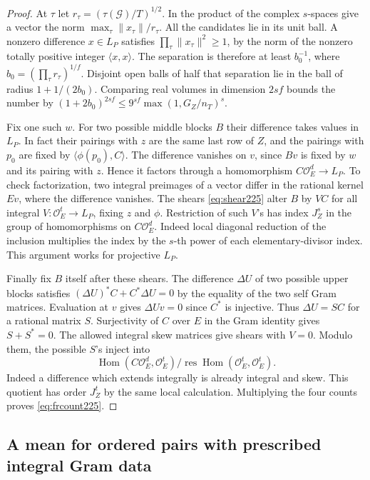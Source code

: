 \documentclass[a4paper,11pt]{article}
\theoremstyle{definition}
\theoremstyle{remark}
\numberwithin{equation}{section}
\newcommand{\OO}{\mathcal O}
\begin{document}
\begin{proof}
At \(\tau\) let \(r_\tau=(\tau(\mathcal G)/T)^{1/2}\).
In the product of the complex \(s\)-spaces give a vector
the norm \(\max_\tau\|x_\tau\|/r_\tau\). All the candidates
lie in its unit ball. A nonzero difference \(x\in L_P\)
satisfies \(\prod_\tau\|x_\tau\|^2\ge1\), by the norm of the
nonzero totally positive integer \(\langle x,x\rangle\).
The separation is therefore at least
\(b_0^{-1}\), where \(b_0=(\prod_\tau r_\tau)^{1/f}\).
Disjoint open balls of half that separation lie in the
ball of radius \(1+1/(2b_0)\). Comparing real volumes in
dimension \(2sf\) bounds the number by
\((1+2b_0)^{2sf}\le9^{sf}\max(1,G_Z/n_T)^s\).

Fix one such \(w\). For two possible middle blocks \(B\)
their difference takes values in \(L_P\). In fact their
pairings with \(z\) are the same last row of \(Z\), and
the pairings with \(p_0\) are fixed by
\(\langle\phi(p_0),C\rangle\). The difference vanishes on
\(v\), since \(Bv\) is fixed by \(w\) and its pairing with
\(z\). Hence it factors through a homomorphism
\(C\OO_E^d\to L_P\). To check factorization, two integral
preimages of a vector differ in the rational kernel \(Ev\),
where the difference vanishes. The shears \eqref{eq:shear225}
alter \(B\) by \(VC\) for all integral \(V:\OO_E^t\to L_P\),
fixing \(z\) and \(\phi\). Restriction of such \(V\)'s has
index \(J_Z^s\) in the group of homomorphisms on \(C\OO_E^d\).
Indeed local diagonal reduction of the inclusion multiplies
the index by the \(s\)-th power of each elementary-divisor
index. This argument works for projective \(L_P\).

Finally fix \(B\) itself after these shears. The difference
\(\Delta U\) of two possible upper blocks satisfies
\((\Delta U)^* C+C^*\Delta U=0\) by the equality of the
two self Gram matrices. Evaluation at \(v\) gives
\(\Delta Uv=0\) since \(C^*\) is injective. Thus
\(\Delta U=S C\) for a rational matrix \(S\). Surjectivity
of \(C\) over \(E\) in the Gram identity gives \(S+S^*=0\).
The allowed integral skew matrices give shears with \(V=0\).
Modulo them, the possible \(S\)'s inject into
\[
 \operatorname{Hom}(C\OO_E^d,\OO_E^t)/
            \operatorname{res}\operatorname{Hom}(\OO_E^t,\OO_E^t).
\]
Indeed a difference which extends integrally is already
integral and skew. This quotient has order \(J_Z^t\)
by the same local calculation. Multiplying the four
counts proves \eqref{eq:frcount225}.
\end{proof}

\subsection{A mean for ordered pairs with prescribed integral Gram data}\label{nav:IX-15}
\label{sec:pairmean225}
\end{document}

